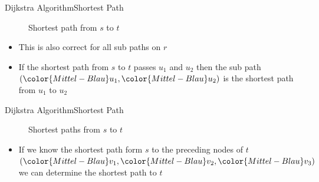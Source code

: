\begin{frame}{Dijkstra Algorithm}{Shortest Path}
  \vspace{-1.5em}
  \begin{figure}
    \begin{adjustbox}{width=0.75\linewidth}
      
    \end{adjustbox}
    \label{fig:dijkstra:shortest_path_introduction_re}
    \caption{Shortest path from {\color{Mittel-Blau}$s$} to
      {\color{Mittel-Blau}$t$}}
  \end{figure}
  \vspace{-1.5em}
  \begin{itemize}
    \item
      This is also correct for all sub paths on {\color{Mittel-Gruen}$r$}
    \item
      If the shortest path from {\color{Mittel-Blau}$s$} to
      {\color{Mittel-Blau}$t$} passes {\color{Mittel-Blau}$u_1$} and
      {\color{Mittel-Blau}$u_2$} then the sub path
      $({\color{Mittel-Blau}u_1}, {\color{Mittel-Blau}u_2})$
      is the shortest path from {\color{Mittel-Blau}$u_1$} to
      {\color{Mittel-Blau}$u_2$}
  \end{itemize}
\end{frame}


\begin{frame}{Dijkstra Algorithm}{Shortest Path}
  \begin{figure}%
    \begin{adjustbox}{width=0.75\linewidth}%
    \end{adjustbox}%
    \vspace{-1.0em}
    \label{fig:dijkstra:shortest_paths_introduction}%
    \caption{Shortest paths from {\color{Mittel-Blau}$s$} to
      {\color{Mittel-Blau}$t$}}
  \end{figure}
  \vspace{-1.0em}
  \begin{itemize}
    \item
      If we know the shortest path form {\color{Mittel-Blau}$s$}
      to the preceding nodes of {\color{Mittel-Blau}$t$}
      \begin{math}
        (
          {\color{Mittel-Blau}v_1},
          {\color{Mittel-Blau}v_2},
          {\color{Mittel-Blau}v_3}
        )
       \end{math}
       we can determine the shortest path to {\color{Mittel-Blau}$t$}
   \end{itemize}
\end{frame}

